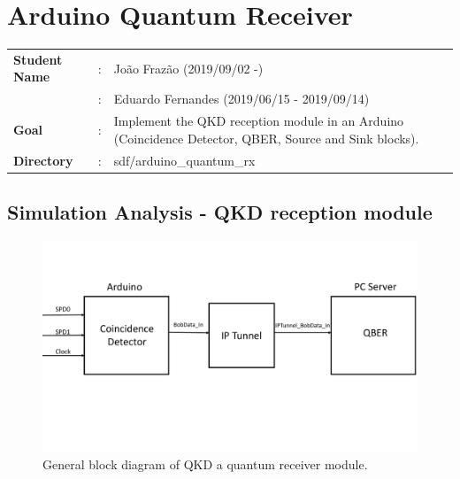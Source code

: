 \clearpage
\section{Arduino Quantum Receiver}

\begin{refsection}

\begin{tcolorbox}	
\begin{tabular}{p{2.75cm} p{0.2cm} p{10.5cm}} 	
\textbf{Student Name}  &:& 	Jo\~ao Fraz\~ao (2019/09/02 -)\\
					   &:&  Eduardo Fernandes (2019/06/15 - 2019/09/14)\\
\textbf{Goal}          &:& Implement the QKD reception module in an Arduino (Coincidence Detector, QBER, Source and Sink blocks).\\
\textbf{Directory}              &:& sdf/arduino\_quantum\_rx
\end{tabular}
\end{tcolorbox}


\subsection{Simulation Analysis - QKD reception module}

\begin{figure}[H]
	\centering
	\includegraphics[width=1\linewidth]{./sdf/arduino_quantum_rx/figures/generalDiagram.pdf}
	\caption{General block diagram of QKD a quantum receiver module.}
	\label{fig:arduino}
\end{figure}


\end{refsection}
